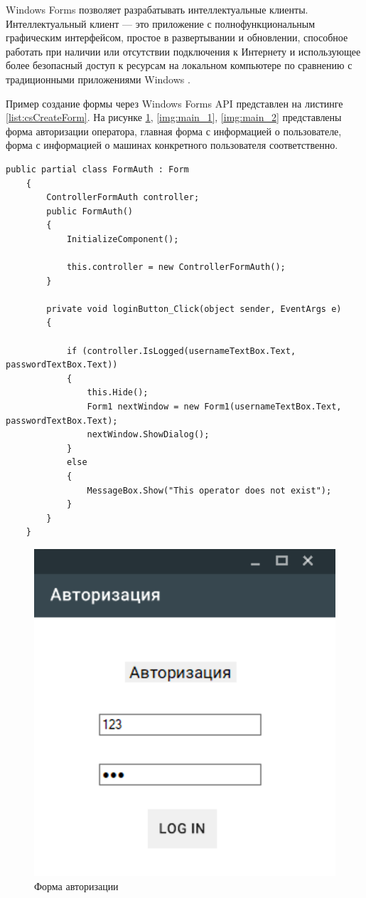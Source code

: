 Windows Forms позволяет разрабатывать интеллектуальные клиенты. Интеллектуальный клиент — это приложение с полнофункциональным графическим интерфейсом, простое в развертывании и обновлении, способное работать при наличии или отсутствии подключения к Интернету и использующее более безопасный доступ к ресурсам на локальном компьютере по сравнению с традиционными приложениями Windows \cite{microsoft-wondowsforms}.

Пример создание формы через Windows Forms API представлен на листинге \ref{list:csCreateForm}. На рисунке \ref{img:auth}, \ref{img:main_1}, \ref{img:main_2} представлены форма авторизации оператора, главная форма с информацией о пользователе, форма с информацией о машинах конкретного пользователя соответственно. 

\begin{lstlisting}[caption=Пример создания формы в программе оператора, label = list:csCreateForm]
	public partial class FormAuth : Form
	{
		ControllerFormAuth controller;
		public FormAuth()
		{
			InitializeComponent();
	
			this.controller = new ControllerFormAuth();
		}
	
		private void loginButton_Click(object sender, EventArgs e)
		{
	
			if (controller.IsLogged(usernameTextBox.Text, passwordTextBox.Text))
			{
				this.Hide();
				Form1 nextWindow = new Form1(usernameTextBox.Text, passwordTextBox.Text);
				nextWindow.ShowDialog();
			}
			else
			{
				MessageBox.Show("This operator does not exist");
			}
		}
	}
\end{lstlisting}

\begin{figure}[H]
	\centering
	\includegraphics[scale=0.9]{img/auth.png}
	\caption{Форма авторизации}
	\label{img:auth}
\end{figure}

